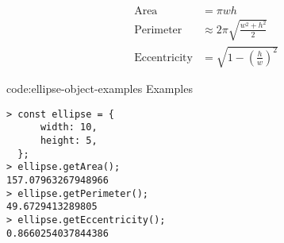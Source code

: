 \begin{equation}\begin{aligned}
    \text{Area}&=\pi wh \\
    \text{Perimeter}&\approx2\pi\sqrt{\frac{w^2+h^2}{2}} \\
    \text{Eccentricity}&=\sqrt{1-\left(\frac{h}{w}\right)^2}
\end{aligned}\end{equation}

\begin{codeenv}{code:ellipse-object-examples}{ Examples}
\begin{verbatim}
> const ellipse = {
      width: 10,
      height: 5,
  };
> ellipse.getArea();
157.07963267948966
> ellipse.getPerimeter();
49.6729413289805
> ellipse.getEccentricity();
0.8660254037844386
\end{verbatim}
\end{codeenv}
